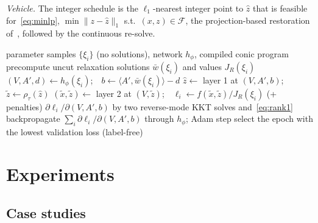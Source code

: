\documentclass[10pt]{article}
\begin{document}
\emph{Vehicle.} The integer schedule is the $\ell_1$-nearest integer point to $\hat z$ that is feasible for~\eqref{eq:minlp}, $\min\|z-\hat z\|_1$ s.t.\ $(x,z)\in\mathcal F$, the projection-based restoration of~\citep{dixit2025dfsm}, followed by the continuous re-solve.

\begin{algorithm}[t]
\caption{Self-supervised training of the cut generator}
\label{alg:train}
\begin{algorithmic}[1]
\Require parameter samples $\{\xi_i\}$ (no solutions), network $h_\phi$, compiled conic program
\State precompute uncut relaxation solutions $\bar w(\xi_i)$ and values $J_R(\xi_i)$
    \State $(V,A',d)\gets h_\phi(\xi_i)$;\ \ $b\gets\langle A',\bar w(\xi_i)\rangle-d$ 
    \State $\hat z\gets$ layer 1 at $(V,A',b)$;\ \ $\tilde z\gets\rho_\tau(\hat z)$ 
    \State $(\tilde x,\tilde z)\gets$ layer 2 at $(V,\tilde z)$;\ \ $\ell_i\gets f(\tilde x,\tilde z)/J_R(\xi_i)$ (+ penalties)
    \State $\partial\ell_i/\partial(V,A',b)$ by two reverse-mode KKT solves and~\eqref{eq:rank1}
  \EndFor
  \State backpropagate $\sum_i\partial\ell_i/\partial(V,A',b)$ through $h_\phi$; Adam step
\EndFor
\State select the epoch with the lowest validation loss (label-free)
\end{algorithmic}
\end{algorithm}

\section{Experiments}
\label{sec:experiments}

\subsection{Case studies}
\end{document}
